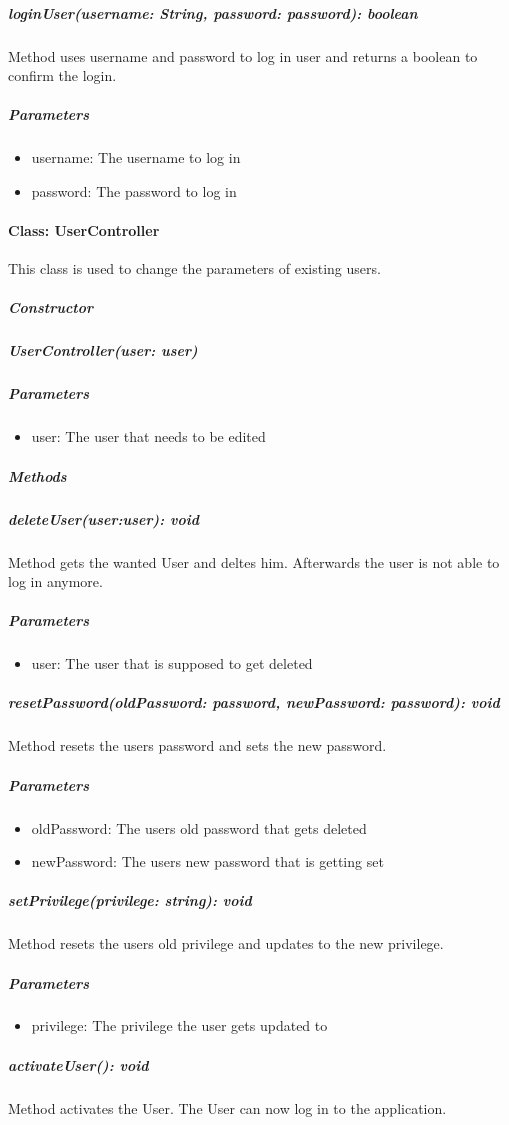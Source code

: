 \subparagraph{loginUser(username: String, password: password): boolean}

Method uses username and password to log in user and returns a boolean to confirm the login.

\subparagraph{Parameters}
\begin{itemize}
	\item{username:}
	The username to log in
	\item{password:}
	The password to log in
\end{itemize}




\paragraph{Class: UserController}
This class is used to change the parameters of existing users.

\subparagraph{Constructor}

\subparagraph{UserController(user: user)}

\subparagraph{Parameters}

\begin{itemize}
	\item{user:}
	The user that needs to be edited
\end{itemize}

\subparagraph{Methods}

\subparagraph{deleteUser(user:user): void}

Method gets the wanted User and deltes him. Afterwards the user is not able to log in anymore.

\subparagraph{Parameters}
\begin{itemize}
	\item{user:}
	The user that is supposed to get deleted
\end{itemize}


\subparagraph{resetPassword(oldPassword: password, newPassword: password): void}

Method resets the users password and sets the new password.

\subparagraph{Parameters}
\begin{itemize}
	\item{oldPassword:}
	The users old password that gets deleted
	\item{newPassword:}
	The users new password that is getting set
\end{itemize}

\subparagraph{setPrivilege(privilege: string): void}

Method resets the users old privilege and updates to the new privilege.

\subparagraph{Parameters}
\begin{itemize}
	\item{privilege:}
	The privilege the user gets updated to
\end{itemize}

\subparagraph{activateUser(): void}

Method activates the User. The User can now log in to the application.










